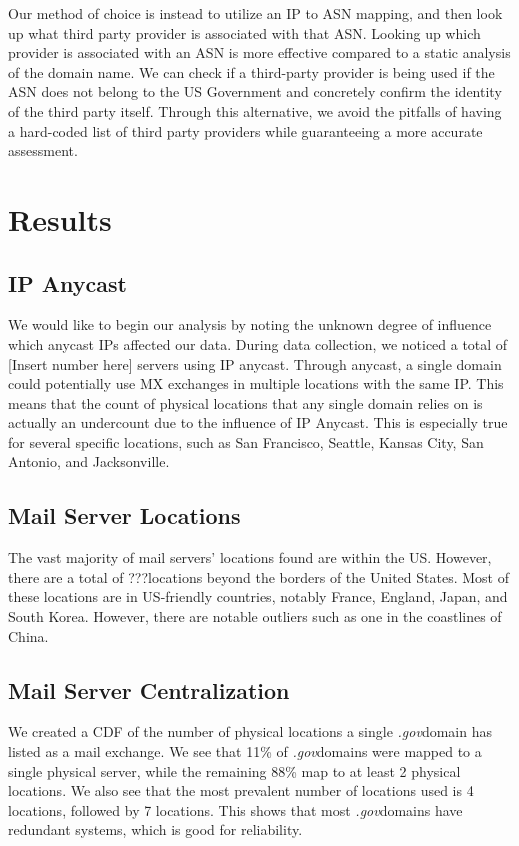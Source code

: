 \documentclass{hotnets21}
\newcommand{\dotgov}{\textit{.gov}\space}
\newcommand{\foreignmslocations}{???\space}
\begin{document}
Our method of choice is instead to utilize an IP to ASN mapping, and then look up what third party provider is associated with that ASN.
Looking up which provider is associated with an ASN is more effective compared to a static analysis of the domain name.
We can check if a third-party provider is being used if the ASN does not belong to the US Government and concretely confirm the identity of the third party itself.
Through this alternative, we avoid the pitfalls of having a hard-coded list of third party providers while guaranteeing a more accurate assessment.

\section{Results}

\subsection{IP Anycast}

We would like to begin our analysis by noting the unknown degree of influence which anycast IPs affected our data.
During data collection, we noticed a total of [Insert number here] servers using IP anycast.
Through anycast, a single domain could potentially use MX exchanges in multiple locations with the same IP.
This means that the count of physical locations that any single domain relies on is actually an undercount due to the influence of IP Anycast.
This is especially true for several specific locations, such as San Francisco, Seattle, Kansas City, San Antonio, and Jacksonville.

\subsection{Mail Server Locations}

The vast majority of mail servers’ locations found are within the US.
However, there are a total of \foreignmslocations locations beyond the borders of the United States.
Most of these locations are in US-friendly countries, notably France, England, Japan, and South Korea.
However, there are notable outliers such as one in the coastlines of China.

\subsection{Mail Server Centralization}

We created a CDF of the number of physical locations a single \dotgov domain has listed as a mail exchange.
We see that 11\% of \dotgov domains were mapped to a single physical server, while the remaining 88\% map to at least 2 physical locations.
We also see that the most prevalent number of locations used is 4 locations, followed by 7 locations.
This shows that most \dotgov domains have redundant systems, which is good for reliability.
\end{document}
